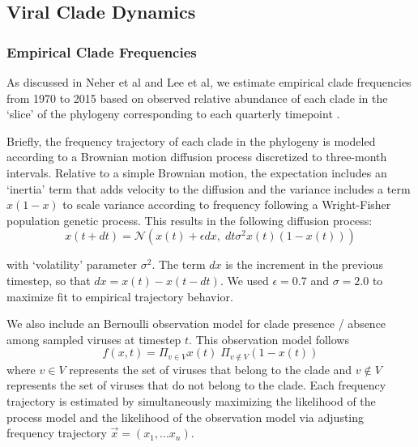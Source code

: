 \documentclass[11pt,oneside,letterpaper]{article}
\begin{document}
\subsection*{Viral Clade Dynamics}
\subsubsection{Empirical Clade Frequencies}
As discussed in Neher et al and Lee et al, we estimate empirical clade frequencies from 1970 to 2015 based on observed relative abundance of each clade in the `slice' of the phylogeny corresponding to each quarterly timepoint \citep{lee2018deep,neher2016prediction}.

Briefly, the frequency trajectory of each clade in the phylogeny is modeled according to a Brownian motion diffusion process discretized to three-month intervals.
Relative to a simple Brownian motion, the expectation includes an `inertia' term that adds velocity to the diffusion and the variance includes a term $x(1-x)$ to scale variance according to frequency following a Wright-Fisher population genetic process.
This results in the following diffusion process:
\begin{equation}
  \label{eq_estimate_frequency}
x(t+dt) = \mathcal{N}\left(x(t) + \epsilon dx, \; dt \sigma^2 x(t) (1-x(t))\right)
\end{equation}

with `volatility' parameter $\sigma^2$.
The term $dx$ is the increment in the previous timestep, so that $dx = x(t) - x(t-dt)$.
We used $\epsilon = 0.7$ and $\sigma = 2.0$ to maximize fit to empirical trajectory behavior.

We also include an Bernoulli observation model for clade presence / absence among sampled viruses at timestep $t$.
This observation model follows
\begin{equation}
f(x,t) = \Pi_{v \in V} x(t) \; \Pi_{v \notin V} (1-x(t))
\end{equation}
where $v \in V$ represents the set of viruses that belong to the clade and $v \notin V$ represents the set of viruses that do not belong to the clade.
Each frequency trajectory is estimated by simultaneously maximizing the likelihood of the process model and the likelihood of the observation model via adjusting frequency trajectory $\vec{x} = (x_1, ... x_n)$.
\end{document}
